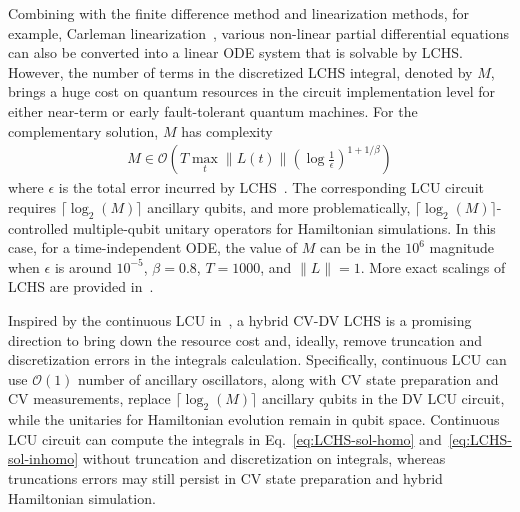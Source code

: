 \documentclass{article}
\newcommand{\Ocal}{\mathcal{O}}
\begin{document}
Combining with the finite difference method and linearization methods, for example, Carleman linearization~\cite{liu2021carleman}, various non-linear partial differential equations can also be converted into a linear ODE system that is solvable by LCHS. However, the number of terms in the discretized LCHS integral, denoted by $M$, brings a huge cost on quantum resources in the circuit implementation level for either near-term or early fault-tolerant quantum machines. For the complementary solution, $M$ has complexity
\begin{align*}
        M \in \Ocal\left( T \max_t \|L(t)\|\left(\log \frac{1}{\epsilon}\right)^{1+1/\beta} \right)
\end{align*}
where $\epsilon$ is the total error incurred by LCHS~\cite{LCHS2}. The corresponding LCU circuit requires $\lceil\log_2(M)\rceil$ ancillary qubits, and more problematically, $\lceil\log_2(M)\rceil$-controlled multiple-qubit unitary operators for Hamiltonian simulations. In this case, for a time-independent ODE, the value of $M$ can be in the $10^6$ magnitude when $\epsilon$ is around $10^{-5}$, $\beta=0.8$, $T=1000$, and $\|L\|=1$. More exact scalings of LCHS are provided in~\cite{pocrnic2025constant}. 




Inspired by the continuous LCU in~\cite{bell2025co}, a hybrid CV-DV LCHS is a promising direction to bring down the resource cost and, ideally, remove truncation and discretization errors in the integrals calculation. Specifically, continuous LCU can use $\Ocal(1)$ number of ancillary oscillators, along with CV state preparation and CV measurements, replace $\lceil\log_2(M)\rceil$ ancillary qubits in the DV LCU circuit, while the unitaries for Hamiltonian evolution remain in qubit space. Continuous LCU circuit can compute the integrals in Eq.~\eqref{eq:LCHS-sol-homo} and~\eqref{eq:LCHS-sol-inhomo} without truncation and discretization on integrals, whereas truncations errors may still persist in CV state preparation and hybrid Hamiltonian simulation.







\end{document}
